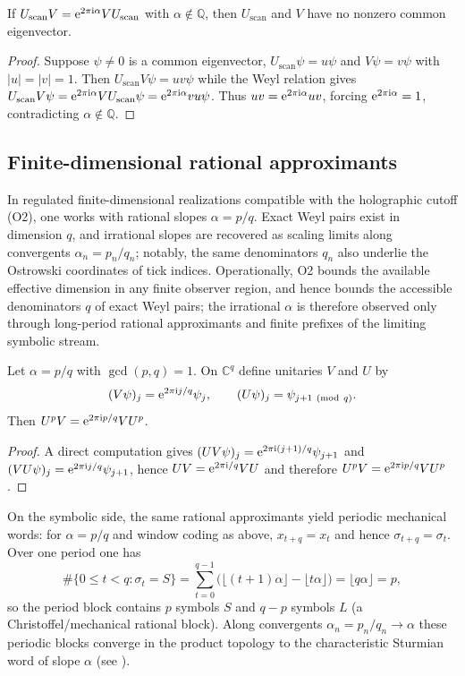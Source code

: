 \begin{proposition}
If $U_{\mathrm{scan}}V=\mathrm{e}^{2\pi \mathrm{i} \alpha}VU_{\mathrm{scan}}$ with $\alpha\notin\mathbb{Q}$, then $U_{\mathrm{scan}}$ and $V$ have no nonzero common eigenvector.
\end{proposition}
\begin{proof}
Suppose $\psi\neq 0$ is a common eigenvector, $U_{\mathrm{scan}}\psi=u\psi$ and $V\psi=v\psi$ with $|u|=|v|=1$. Then
$U_{\mathrm{scan}}V\psi=uv\psi$ while the Weyl relation gives $U_{\mathrm{scan}}V\psi=\mathrm{e}^{2\pi \mathrm{i} \alpha}VU_{\mathrm{scan}}\psi=\mathrm{e}^{2\pi \mathrm{i} \alpha}vu\psi$.
Thus $uv=\mathrm{e}^{2\pi \mathrm{i} \alpha}uv$, forcing $\mathrm{e}^{2\pi \mathrm{i} \alpha}=1$, contradicting $\alpha\notin\mathbb{Q}$.
\end{proof}

\subsection{Finite-dimensional rational approximants}
In regulated finite-dimensional realizations compatible with the holographic cutoff (O2), one works with rational slopes $\alpha=p/q$. Exact Weyl pairs exist in dimension $q$, and irrational slopes are recovered as scaling limits along convergents $\alpha_n=p_n/q_n$; notably, the same denominators $q_n$ also underlie the Ostrowski coordinates of tick indices.
Operationally, O2 bounds the available effective dimension in any finite observer region, and hence bounds the accessible denominators $q$ of exact Weyl pairs; the irrational $\alpha$ is therefore observed only through long-period rational approximants and finite prefixes of the limiting symbolic stream.
\begin{proposition}
Let $\alpha=p/q$ with $\gcd(p,q)=1$. On $\mathbb{C}^{q}$ define unitaries $V$ and $U$ by
\begin{equation}
    (V\psi)_j=\mathrm{e}^{2\pi \mathrm{i} j/q}\psi_j,\qquad (U\psi)_j=\psi_{j+1\ (\mathrm{mod}\ q)}.
\end{equation}
Then $U^{p}V=\mathrm{e}^{2\pi \mathrm{i} p/q}VU^{p}$.
\end{proposition}
\begin{proof}
A direct computation gives $(UV\psi)_j=\mathrm{e}^{2\pi \mathrm{i} (j+1)/q}\psi_{j+1}$ and $(VU\psi)_j=\mathrm{e}^{2\pi \mathrm{i} j/q}\psi_{j+1}$, hence $UV=\mathrm{e}^{2\pi \mathrm{i} /q}VU$ and therefore $U^{p}V=\mathrm{e}^{2\pi \mathrm{i} p/q}VU^{p}$.
\end{proof}
\par
On the symbolic side, the same rational approximants yield periodic mechanical words: for $\alpha=p/q$ and window coding as above, $x_{t+q}=x_t$ and hence $\sigma_{t+q}=\sigma_t$. Over one period one has
\begin{equation}
    \#\{0\le t<q:\sigma_t=S\}=\sum_{t=0}^{q-1}\bigl(\lfloor (t+1)\alpha\rfloor-\lfloor t\alpha\rfloor\bigr)=\lfloor q\alpha\rfloor=p,
\end{equation}
so the period block contains $p$ symbols $S$ and $q-p$ symbols $L$ (a Christoffel/mechanical rational block). Along convergents $\alpha_n=p_n/q_n\to\alpha$ these periodic blocks converge in the product topology to the characteristic Sturmian word of slope $\alpha$ (see \cite{Ma2025HPA}).

